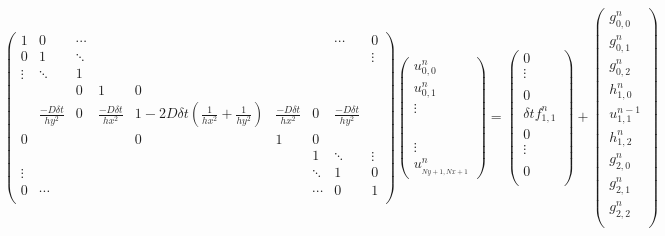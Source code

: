 \documentclass[a4paper,12pt,twoside]{report}
\begin{document}
\[
\begin{pmatrix}
1&0&\cdots&&&&&\cdots&0\\
0&1&\ddots&&&&&&\vdots \\
\vdots &\ddots&1&&\\
&&0&1&0&\\
& \frac{-D \delta t}{hy^{2}} &0& \frac{-D \delta t}{hx^{2}} &1-2D\delta t (\frac{1}{hx^{2}}+\frac{1}{hy^{2}} )    & \frac{-D \delta t}{hx^{2}}  &0 &\frac{-D \delta t}{hy^{2}} &  \\
0&  && &0    &1 &0 &&  \\
  && &   &  &&1&\ddots& \vdots  \\
\vdots  && &    & & &\ddots & 1 &0  \\
0& \cdots && &  &  &\cdots &0&1  \\
\end{pmatrix}
\begin{pmatrix}
  u^{n}_{0,0} \\
  u^{n}_{0,1}\\ 
     \vdots\\
\\
\\
  \\
  \\
   \vdots\\
 u^{n}__{Ny+1,Nx+1}
\end{pmatrix} = \begin{pmatrix}
 0 \\
\vdots  \\ 
\\
 0 \\

\delta t f^{n}_{1,1}\\
 0\\
\vdots  \\
\\
   0\\
\end{pmatrix}+\begin{pmatrix}
 g^{n}_{0,0} \\
 g^{n}_{0,1} \\
 g^{n}_{0,2} \\
 h^{n}_{1,0} \\

 u^{n-1}_{1,1}\\
  h^{n}_{1,2} \\

 g^{n}_{2,0} \\
 g^{n}_{2,1} \\
 g^{n}_{2,2} \\

\end{pmatrix} \]
\end{document}
